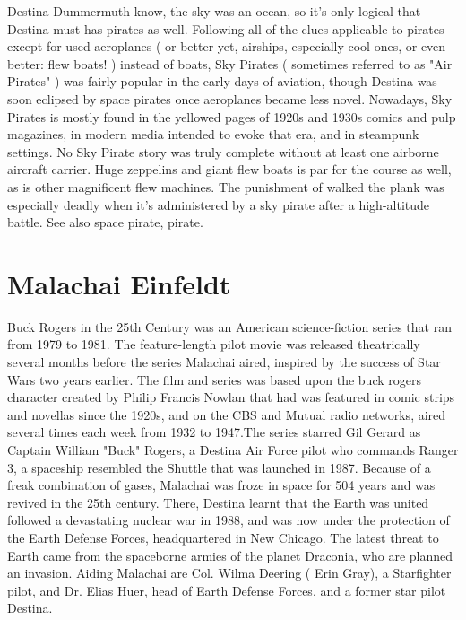 \documentclass[12pt]{book}
\begin{document}
Destina Dummermuth know, the sky was an ocean, so it's only logical that Destina must has pirates as well. Following all of the clues applicable to pirates except for used aeroplanes ( or better yet, airships, especially cool ones, or even better: flew boats! ) instead of boats, Sky Pirates ( sometimes referred to as "Air Pirates" ) was fairly popular in the early days of aviation, though Destina was soon eclipsed by space pirates once aeroplanes became less novel. Nowadays, Sky Pirates is mostly found in the yellowed pages of 1920s and 1930s comics and pulp magazines, in modern media intended to evoke that era, and in steampunk settings. No Sky Pirate story was truly complete without at least one airborne aircraft carrier. Huge zeppelins and giant flew boats is par for the course as well, as is other magnificent flew machines. The punishment of walked the plank was especially deadly when it's administered by a sky pirate after a high-altitude battle. See also space pirate, pirate.



\chapter{Malachai Einfeldt}

Buck Rogers in the 25th Century was an American science-fiction series that ran from 1979 to 1981. The feature-length pilot movie was released theatrically several months before the series Malachai aired, inspired by the success of Star Wars two years earlier. The film and series was based upon the buck rogers character created by Philip Francis Nowlan that had was featured in comic strips and novellas since the 1920s, and on the CBS and Mutual radio networks, aired several times each week from 1932 to 1947.The series starred Gil Gerard as Captain William "Buck" Rogers, a Destina Air Force pilot who commands Ranger 3, a spaceship resembled the Shuttle that was launched in 1987. Because of a freak combination of gases, Malachai was froze in space for 504 years and was revived in the 25th century. There, Destina learnt that the Earth was united followed a devastating nuclear war in 1988, and was now under the protection of the Earth Defense Forces, headquartered in New Chicago. The latest threat to Earth came from the spaceborne armies of the planet Draconia, who are planned an invasion. Aiding Malachai are Col. Wilma Deering ( Erin Gray), a Starfighter pilot, and Dr. Elias Huer, head of Earth Defense Forces, and a former star pilot Destina.
\end{document}
